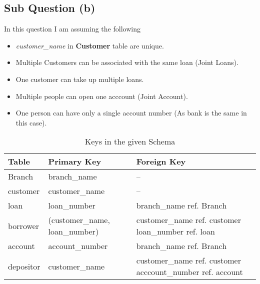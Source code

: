\documentclass{article}
\begin{document}
\newpage


\subsection{Sub Question (b)}
In this question I am assuming the following

\begin{itemize}
  \item \textit{customer\_name} in \textbf{Customer} table are unique.
  \item Multiple Customers can be associated with the same loan (Joint Loans).
  \item One customer can take up multiple loans. 
  \item Multiple people can open one acccount (Joint Account).
  \item One person can have only a single account number (As bank is the same in this case).
\end{itemize}

  \begin{table}[ht]
    \centering
    \begin{center}
    \begin{tabular}{||C{3cm}||C{3cm}||C{3cm}||}
    \hline  
    \hline
    \textbf{Table} & \textbf{Primary Key}  & \textbf{Foreign Key}\\
    \hline \hline

    Branch & branch\_name  & -- \\
    \hline \hline

    customer & customer\_name  & -- \\
    \hline \hline

    loan & loan\_number  & branch\_name ref. Branch \\
    \hline \hline

    borrower & (customer\_name, loan\_number)  & customer\_name ref. customer loan\_number ref. loan \\
    \hline \hline

    account & account\_number  & branch\_name ref. Branch \\
    \hline \hline

    depositor & customer\_name  & customer\_name ref. customer acccount\_number ref. account \\
    \hline \hline

    \end{tabular}
  \end{center}
  \caption{Keys in the given Schema}
  \end{table}
\end{document}
